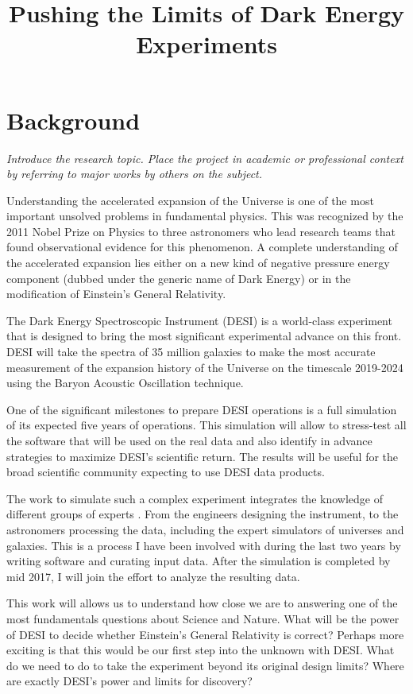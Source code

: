 \documentclass[12pt]{article}
\title{Pushing the Limits of Dark Energy Experiments}
\begin{document}
\maketitle
\section*{Background}
\textit{Introduce the research topic. Place the project in academic or
professional context by referring to major works by others on the
subject. }

Understanding the accelerated expansion of the Universe is one of the
most important unsolved problems in fundamental physics.  
This was recognized by the 2011 Nobel Prize on Physics to three
astronomers who lead research teams that found observational evidence for
this phenomenon.  A complete understanding of the accelerated
expansion lies either on a new kind of negative pressure energy
component (dubbed under the generic name of Dark Energy) or in the
modification of Einstein's General Relativity. 

The Dark Energy Spectroscopic Instrument (DESI) is a world-class
experiment that is designed to bring the most significant experimental
advance on this front. 
DESI will take the spectra of 35 million galaxies to make the most
accurate measurement of the expansion history of the Universe on the
timescale 2019-2024 using the Baryon Acoustic Oscillation technique.  

One of the significant milestones to prepare DESI operations is a
full simulation of its expected five years of operations.
This simulation will allow to stress-test all the software that will
be used on the real data and also identify in advance strategies to
maximize DESI's scientific return.  
The results will be useful for the broad scientific community
expecting to use DESI data products.

The work to simulate such a complex experiment integrates the knowledge of
different groups of experts \cite{2016A&C....15....1N}. From the
engineers designing   the instrument, to the astronomers processing
the data, including the expert simulators of universes and
galaxies. This is a process I have been involved with during the last
two years by writing software and curating input data.
After the simulation is completed by mid 2017, I will join the effort
to analyze the resulting data.

 
This work will allows us to understand how close we are to answering
one of the most fundamentals questions about Science and Nature. What
will be the power of DESI to decide whether Einstein's General
Relativity is correct?  
Perhaps more exciting is that this would be our first step into the
unknown with DESI. What do we need to do to take the experiment beyond its
original design limits? Where are exactly DESI's power and limits for
discovery?  
\end{document}
